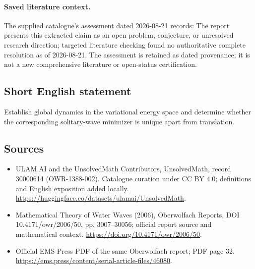 \documentclass[11pt]{article}
\begin{document}
\paragraph{Saved literature context.} The supplied catalogue's assessment dated 2026-08-21 records: The report presents this extracted claim as an open problem, conjecture, or unresolved research direction; targeted literature checking found no authoritative complete resolution as of 2026-08-21. The assessment is retained as dated provenance; it is not a new comprehensive literature or open-status certification.
\subsection{Short English statement}
Establish global dynamics in the variational energy space and determine whether the corresponding solitary-wave minimizer is unique apart from translation.
\subsection{Sources}
\begin{itemize}
\item[\hypertarget{source:30000614:1}{S1}] ULAM.AI and the UnsolvedMath Contributors, UnsolvedMath, record 30000614 (OWR-1388-002). Catalogue curation under CC BY 4.0; definitions and English exposition added locally.
\url{https://huggingface.co/datasets/ulamai/UnsolvedMath}.
\item[\hypertarget{source:30000614:2}{S2}] Mathematical Theory of Water Waves (2006), Oberwolfach Reports, DOI 10.4171/owr/2006/50, pp. 3007--30056; official report source and mathematical context.
\url{https://doi.org/10.4171/owr/2006/50}.
\item[\hypertarget{source:30000614:3}{S3}] Official EMS Press PDF of the same Oberwolfach report; PDF page 32.
\url{https://ems.press/content/serial-article-files/46080}.
\end{itemize}
\label{end:30000614}
\end{document}
